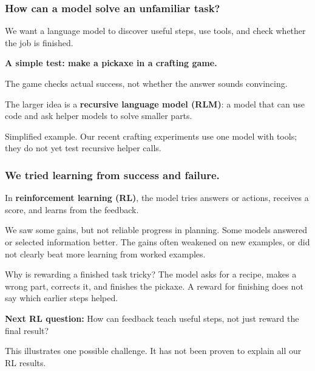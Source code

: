 \documentclass[aspectratio=169,12pt]{beamer}
\newcommand{\aside}[1]{\vfill{\footnotesize\color{Gray}#1\par}}
\begin{document}
\begin{frame}[t]
\frametitle{How can a model solve an unfamiliar task?}
We want a language model to discover useful steps, use tools, and check whether the job is finished.
\medskip

\textbf{A simple test: make a pickaxe in a crafting game.}
\begin{center}
\end{center}
The game checks actual success, not whether the answer sounds convincing.
\medskip

The larger idea is a \textbf{recursive language model (RLM)}: a model that can use code and ask helper models to solve smaller parts.
\aside{Simplified example. Our recent crafting experiments use one model with tools; they do not yet test recursive helper calls.}
\end{frame}

\begin{frame}[t]
\frametitle{We tried learning from success and failure.}
In \textbf{reinforcement learning (RL)}, the model tries answers or actions, receives a score, and learns from the feedback.
\begin{block}{We saw some gains, but not reliable progress in planning.}
Some models answered or selected information better. The gains often weakened on new examples, or did not clearly beat more learning from worked examples.
\end{block}
\begin{block}{Why is rewarding a finished task tricky?}
The model asks for a recipe, makes a wrong part, corrects it, and finishes the pickaxe. A reward for finishing does not say which earlier steps helped.
\end{block}
\textbf{Next RL question:} How can feedback teach useful steps, not just reward the final result?
\aside{This illustrates one possible challenge. It has not been proven to explain all our RL results.}
\end{frame}
\end{document}
